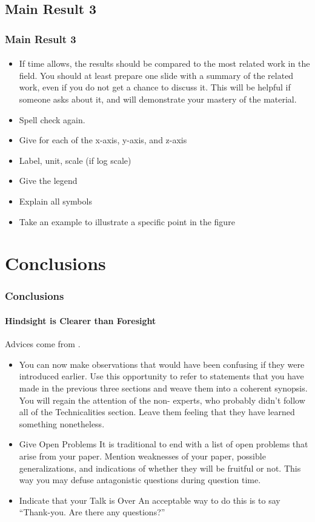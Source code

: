 \documentclass[11pt]{beamer}              %
\begin{document}
\subsection{Main Result 3}
\begin{frame}
\frametitle{Main Result 3}
\framesubtitle{}
\begin{itemize}
\item If time allows, the results should be compared to the most related work in the field. You should at least prepare one slide with a summary of the related work, even if you do not get a chance to discuss it. This will be helpful if someone asks about it, and will demonstrate your mastery of the material.
\item Spell check again.
\item Give for each of the x-axis, y-axis, and z-axis
\item Label, unit, scale (if log scale)
\item Give the legend
\item Explain all symbols
\item Take an example to illustrate a specific point in the figure
\end{itemize}
\end{frame}



\section{Conclusions}
\begin{frame}
\frametitle{Conclusions}
\framesubtitle{Hindsight is Clearer than Foresight}
Advices come from \cite{spillman2000present}.
\begin{itemize}
\item You can now make observations that would have been confusing if they were introduced earlier. Use this opportunity to refer to statements that you have made in the previous three sections and weave them into a coherent synopsis. You will regain the attention of the non- experts, who probably didn’t follow all of the Technicalities section. Leave them feeling that they have learned something nonetheless.
\item Give Open Problems It is traditional to end with a list of open problems that arise from your paper. Mention weaknesses of your paper, possible generalizations, and indications of whether they will be fruitful or not. This way you may defuse antagonistic questions during question time.
\item Indicate that your Talk is Over
An acceptable way to do this is to say “Thank-you. Are there any questions?”\cite{einstein}
\end{itemize}

\end{frame}
\end{document}
